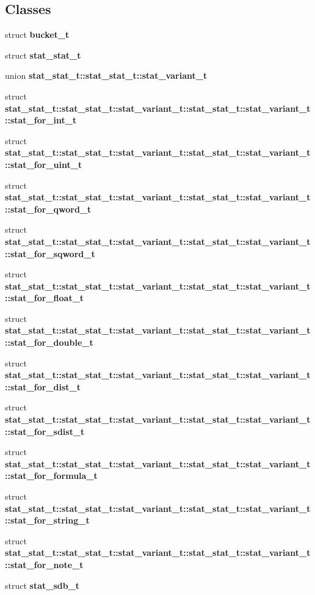 \subsection*{Classes}
\begin{CompactItemize}
\item 
struct {\bf bucket\_\-t}
\item 
struct {\bf stat\_\-stat\_\-t}
\item 
union {\bf stat\_\-stat\_\-t::stat\_\-stat\_\-t::stat\_\-variant\_\-t}
\item 
struct {\bf stat\_\-stat\_\-t::stat\_\-stat\_\-t::stat\_\-variant\_\-t::stat\_\-stat\_\-t::stat\_\-variant\_\-t::stat\_\-for\_\-int\_\-t}
\item 
struct {\bf stat\_\-stat\_\-t::stat\_\-stat\_\-t::stat\_\-variant\_\-t::stat\_\-stat\_\-t::stat\_\-variant\_\-t::stat\_\-for\_\-uint\_\-t}
\item 
struct {\bf stat\_\-stat\_\-t::stat\_\-stat\_\-t::stat\_\-variant\_\-t::stat\_\-stat\_\-t::stat\_\-variant\_\-t::stat\_\-for\_\-qword\_\-t}
\item 
struct {\bf stat\_\-stat\_\-t::stat\_\-stat\_\-t::stat\_\-variant\_\-t::stat\_\-stat\_\-t::stat\_\-variant\_\-t::stat\_\-for\_\-sqword\_\-t}
\item 
struct {\bf stat\_\-stat\_\-t::stat\_\-stat\_\-t::stat\_\-variant\_\-t::stat\_\-stat\_\-t::stat\_\-variant\_\-t::stat\_\-for\_\-float\_\-t}
\item 
struct {\bf stat\_\-stat\_\-t::stat\_\-stat\_\-t::stat\_\-variant\_\-t::stat\_\-stat\_\-t::stat\_\-variant\_\-t::stat\_\-for\_\-double\_\-t}
\item 
struct {\bf stat\_\-stat\_\-t::stat\_\-stat\_\-t::stat\_\-variant\_\-t::stat\_\-stat\_\-t::stat\_\-variant\_\-t::stat\_\-for\_\-dist\_\-t}
\item 
struct {\bf stat\_\-stat\_\-t::stat\_\-stat\_\-t::stat\_\-variant\_\-t::stat\_\-stat\_\-t::stat\_\-variant\_\-t::stat\_\-for\_\-sdist\_\-t}
\item 
struct {\bf stat\_\-stat\_\-t::stat\_\-stat\_\-t::stat\_\-variant\_\-t::stat\_\-stat\_\-t::stat\_\-variant\_\-t::stat\_\-for\_\-formula\_\-t}
\item 
struct {\bf stat\_\-stat\_\-t::stat\_\-stat\_\-t::stat\_\-variant\_\-t::stat\_\-stat\_\-t::stat\_\-variant\_\-t::stat\_\-for\_\-string\_\-t}
\item 
struct {\bf stat\_\-stat\_\-t::stat\_\-stat\_\-t::stat\_\-variant\_\-t::stat\_\-stat\_\-t::stat\_\-variant\_\-t::stat\_\-for\_\-note\_\-t}
\item 
struct {\bf stat\_\-sdb\_\-t}
\end{CompactItemize}
